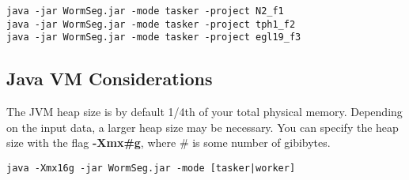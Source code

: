 \documentclass[]{article}
\begin{document}
\begin{lstlisting}[language=command.com, breaklines=true, caption=Mulitple Launch]
java -jar WormSeg.jar -mode tasker -project N2_f1
java -jar WormSeg.jar -mode tasker -project tph1_f2
java -jar WormSeg.jar -mode tasker -project egl19_f3
\end{lstlisting}


\subsection{Java VM Considerations}
The JVM heap size is by default 1/4th of your total physical memory. Depending on the input data, a larger heap size may be necessary. You can specify the heap size with the flag \textbf{-Xmx\#g}, where \# is some number of gibibytes.
\begin{lstlisting}[language=command.com, breaklines=true, caption=Local Machine Worker]
java -Xmx16g -jar WormSeg.jar -mode [tasker|worker]
\end{lstlisting}
\end{document}
